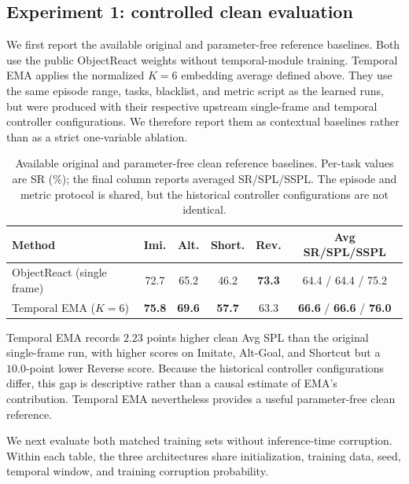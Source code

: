 \documentclass[conference]{IEEEtran}
\begin{document}
\subsection{Experiment 1: controlled clean evaluation}
\label{sec:clean}

We first report the available original and parameter-free reference
baselines. Both use the public ObjectReact weights without temporal-module
training. Temporal EMA applies the normalized $K{=}6$ embedding average
defined above. They use the same episode range, tasks, blacklist, and metric
script as the learned runs, but were produced with their respective upstream
single-frame and temporal controller configurations. We therefore report them
as contextual baselines rather than as a strict one-variable ablation.

\begin{table}[htbp]
\centering
\caption{Available original and parameter-free clean reference baselines.
Per-task values are SR (\%); the final column reports averaged SR/SPL/SSPL.
The episode and metric protocol is shared, but the historical controller
configurations are not identical.}
\label{tab:nonlearned_baselines}
\small
\setlength{\tabcolsep}{3.5pt}
\begin{tabular}{lcccc c}
\toprule
Method & Imi. & Alt. & Short. & Rev. & Avg SR/SPL/SSPL \\
\midrule
ObjectReact (single frame) & 72.7 & 65.2 & 46.2 & \textbf{73.3} & 64.4 / 64.4 / 75.2 \\
Temporal EMA ($K{=}6$)    & \textbf{75.8} & \textbf{69.6} & \textbf{57.7} & 63.3 & \textbf{66.6} / \textbf{66.6} / \textbf{76.0} \\
\bottomrule
\end{tabular}
\end{table}

Temporal EMA records $2.23$ points higher clean Avg SPL than the original
single-frame run, with higher scores on Imitate, Alt-Goal, and Shortcut but a
$10.0$-point lower Reverse score. Because the historical controller
configurations differ, this gap is descriptive rather than a causal estimate
of EMA's contribution. Temporal EMA nevertheless provides a useful
parameter-free clean reference.

We next evaluate both matched training sets without inference-time
corruption. Within each table, the three architectures share initialization,
training data, seed, temporal window, and training corruption probability.
\end{document}
